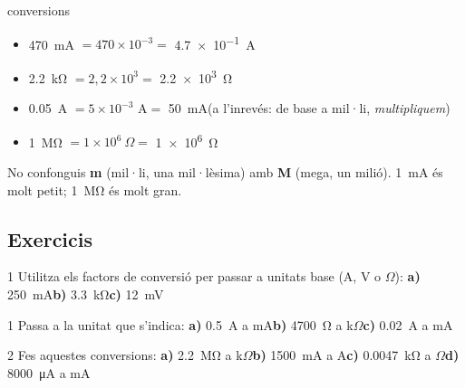 \begin{exemple}{conversions}
\begin{itemize}
 \item \SI{470}{\milli\ampere} $= 470 \times 10^{-3} =$ \SI{4,7e-1}{\ampere}
 \item \SI{2,2}{\kilo\ohm} $= 2{,}2 \times 10^3 =$ \SI{2,2e3}{\ohm}
 \item \SI{0,05}{\ampere} $= 5 \times 10^{-3} \text{ A} =$ \SI{50}{\milli\ampere}\quad (a l'inrevés: de base a mil·li, \emph{multipliquem})
 \item \SI{1}{\mega\ohm} $= 1 \times 10^6 \ \Omega =$ \SI{1e6}{\ohm}
\end{itemize}
\end{exemple}

\begin{atencio}
No confonguis \textbf{m} (mil·li, una mil·lèsima) amb \textbf{M} (mega, un milió). \SI{1}{\milli\ampere} és molt petit; \SI{1}{\mega\ohm} és molt gran.
\end{atencio}

\clearpage
\subsection*{Exercicis}

\begin{exercici}{1}
Utilitza els factors de conversió per passar a unitats base (A, V o $\Omega$):\quad
\textbf{a)} \SI{250}{\milli\ampere}\qquad \textbf{b)} \SI{3,3}{\kilo\ohm}\qquad \textbf{c)} \SI{12}{\milli\volt}
\end{exercici}

\begin{exercici}{1}
Passa a la unitat que s'indica:\quad
\textbf{a)} \SI{0,5}{\ampere} a mA\qquad \textbf{b)} \SI{4700}{\ohm} a k$\Omega$\qquad \textbf{c)} \SI{0,02}{\ampere} a mA
\end{exercici}

\begin{exercici}{2}
Fes aquestes conversions:\quad
\textbf{a)} \SI{2,2}{\mega\ohm} a k$\Omega$\qquad \textbf{b)} \SI{1500}{\milli\ampere} a A\qquad \textbf{c)} \SI{0,0047}{\kilo\ohm} a $\Omega$\qquad \textbf{d)} \SI{8000}{\micro\ampere} a mA
\end{exercici}

